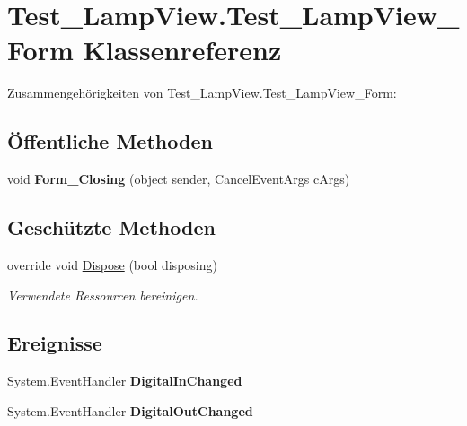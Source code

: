 \hypertarget{class_test___lamp_view_1_1_test___lamp_view___form}{
\section{Test\_\-LampView.Test\_\-LampView\_\-Form Klassenreferenz}
\label{class_test___lamp_view_1_1_test___lamp_view___form}
}


Zusammengehörigkeiten von Test\_\-LampView.Test\_\-LampView\_\-Form:\subsection*{Öffentliche Methoden}
\begin{DoxyCompactItemize}
\item 
\hypertarget{class_test___lamp_view_1_1_test___lamp_view___form_acea2549e6583c8a972c9c5befc70cb34}{
void {\bfseries Form\_\-Closing} (object sender, CancelEventArgs cArgs)}
\label{class_test___lamp_view_1_1_test___lamp_view___form_acea2549e6583c8a972c9c5befc70cb34}

\end{DoxyCompactItemize}
\subsection*{Geschützte Methoden}
\begin{DoxyCompactItemize}
\item 
override void \hyperlink{class_test___lamp_view_1_1_test___lamp_view___form_a867822dded05866aed7e0345c4d45033}{Dispose} (bool disposing)
\begin{DoxyCompactList}\small\item\em Verwendete Ressourcen bereinigen. \item\end{DoxyCompactList}\end{DoxyCompactItemize}
\subsection*{Ereignisse}
\begin{DoxyCompactItemize}
\item 
\hypertarget{class_test___lamp_view_1_1_test___lamp_view___form_a6fc145512e96f2734827edcfdac90bea}{
System.EventHandler {\bfseries DigitalInChanged}}
\label{class_test___lamp_view_1_1_test___lamp_view___form_a6fc145512e96f2734827edcfdac90bea}

\item 
\hypertarget{class_test___lamp_view_1_1_test___lamp_view___form_a972715ffe1356292119585c01f13c87c}{
System.EventHandler {\bfseries DigitalOutChanged}}
\label{class_test___lamp_view_1_1_test___lamp_view___form_a972715ffe1356292119585c01f13c87c}

\end{DoxyCompactItemize}



